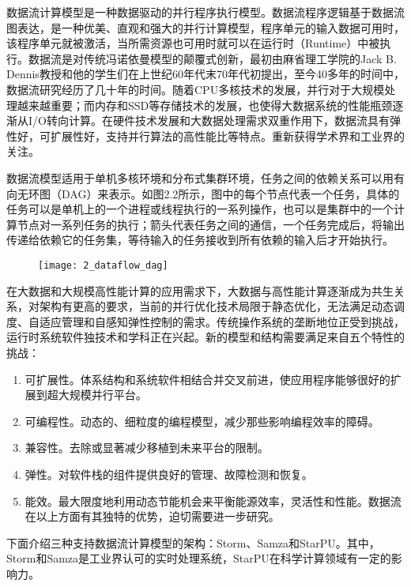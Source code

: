 数据流计算模型是一种数据驱动的并行程序执行模型。数据流程序逻辑基于数据流图表达，是一种优美、直观和强大的并行计算模型，程序单元的输入数据可用时，该程序单元就被激活，当所需资源也可用时就可以在运行时（Runtime）中被执行。数据流是对传统冯诺依曼模型的颠覆式创新，最初由麻省理工学院的Jack B. Dennis教授和他的学生们在上世纪60年代末70年代初提出\citep{dennis1974data}，至今40多年的时间中，数据流研究经历了几十年的时间。随着CPU多核技术的发展，并行对于大规模处理越来越重要；而内存和SSD等存储技术的发展，也使得大数据系统的性能瓶颈逐渐从I/O转向计算。在硬件技术发展和大数据处理需求双重作用下，数据流具有弹性好，可扩展性好，支持并行算法的高性能比等特点。重新获得学术界和工业界的关注。

数据流模型适用于单机多核环境和分布式集群环境，任务之间的依赖关系可以用有向无环图（DAG）来表示。如图2.2所示，图中的每个节点代表一个任务，具体的任务可以是单机上的一个进程或线程执行的一系列操作，也可以是集群中的一个计算节点对一系列任务的执行；箭头代表任务之间的通信，一个任务完成后，将输出传递给依赖它的任务集，等待输入的任务接收到所有依赖的输入后才开始执行。

\begin{figure}[!htbp]
    \centering
    \texttt{[image: 2\_dataflow\_dag]}
    \label{fig:2_dataflow_dag}
\end{figure}

在大数据和大规模高性能计算的应用需求下，大数据与高性能计算逐渐成为共生关系，对架构有更高的要求，当前的并行优化技术局限于静态优化，无法满足动态调度、自适应管理和自感知弹性控制的需求。传统操作系统的垄断地位正受到挑战，运行时系统软件独技术和学科正在兴起。新的模型和结构需要满足来自五个特性的挑战：

\begin{enumerate}
	\item 可扩展性。体系结构和系统软件相结合并交叉前进，使应用程序能够很好的扩展到超大规模并行平台。
	\item 可编程性。动态的、细粒度的编程模型，减少那些影响编程效率的障碍。
	\item 兼容性。去除或显著减少移植到未来平台的限制。
	\item 弹性。对软件栈的组件提供良好的管理、故障检测和恢复。
	\item 能效。最大限度地利用动态节能机会来平衡能源效率，灵活性和性能。数据流在以上方面有其独特的优势，迫切需要进一步研究。
\end{enumerate}

下面介绍三种支持数据流计算模型的架构：Storm、Samza和StarPU。其中，Storm和Samza是工业界认可的实时处理系统，StarPU在科学计算领域有一定的影响力。

